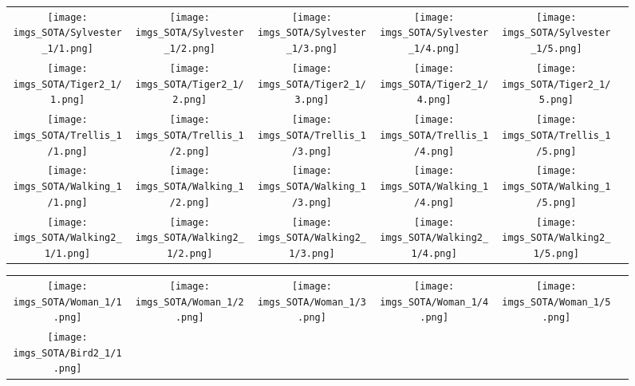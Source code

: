 \begin{figure}[H]
\begin{tabular}{@{}c@{}c@{}c@{}c@{}c@{}c@{}}
\texttt{[image: imgs\_SOTA/Sylvester\_1/1.png]}&
\texttt{[image: imgs\_SOTA/Sylvester\_1/2.png]}&
\texttt{[image: imgs\_SOTA/Sylvester\_1/3.png]}&
\texttt{[image: imgs\_SOTA/Sylvester\_1/4.png]}&
\texttt{[image: imgs\_SOTA/Sylvester\_1/5.png]}&
\\
\texttt{[image: imgs\_SOTA/Tiger2\_1/1.png]}&
\texttt{[image: imgs\_SOTA/Tiger2\_1/2.png]}&
\texttt{[image: imgs\_SOTA/Tiger2\_1/3.png]}&
\texttt{[image: imgs\_SOTA/Tiger2\_1/4.png]}&
\texttt{[image: imgs\_SOTA/Tiger2\_1/5.png]}&
\\
\texttt{[image: imgs\_SOTA/Trellis\_1/1.png]}&
\texttt{[image: imgs\_SOTA/Trellis\_1/2.png]}&
\texttt{[image: imgs\_SOTA/Trellis\_1/3.png]}&
\texttt{[image: imgs\_SOTA/Trellis\_1/4.png]}&
\texttt{[image: imgs\_SOTA/Trellis\_1/5.png]}&
\\
\texttt{[image: imgs\_SOTA/Walking\_1/1.png]}&
\texttt{[image: imgs\_SOTA/Walking\_1/2.png]}&
\texttt{[image: imgs\_SOTA/Walking\_1/3.png]}&
\texttt{[image: imgs\_SOTA/Walking\_1/4.png]}&
\texttt{[image: imgs\_SOTA/Walking\_1/5.png]}&
\\
\texttt{[image: imgs\_SOTA/Walking2\_1/1.png]}&
\texttt{[image: imgs\_SOTA/Walking2\_1/2.png]}&
\texttt{[image: imgs\_SOTA/Walking2\_1/3.png]}&
\texttt{[image: imgs\_SOTA/Walking2\_1/4.png]}&
\texttt{[image: imgs\_SOTA/Walking2\_1/5.png]}&
\\
\end{tabular}\end{figure}\begin{figure}[H]
\setlength{\tabcolsep}{6pt}
\renewcommand{\arraystretch}{0}
\begin{tabular}{@{}c@{}c@{}c@{}c@{}c@{}c@{}}\texttt{[image: imgs\_SOTA/Woman\_1/1.png]}&
\texttt{[image: imgs\_SOTA/Woman\_1/2.png]}&
\texttt{[image: imgs\_SOTA/Woman\_1/3.png]}&
\texttt{[image: imgs\_SOTA/Woman\_1/4.png]}&
\texttt{[image: imgs\_SOTA/Woman\_1/5.png]}&
\\
\texttt{[image: imgs\_SOTA/Bird2\_1/1.png]}&

\end{tabular}
\end{figure}
